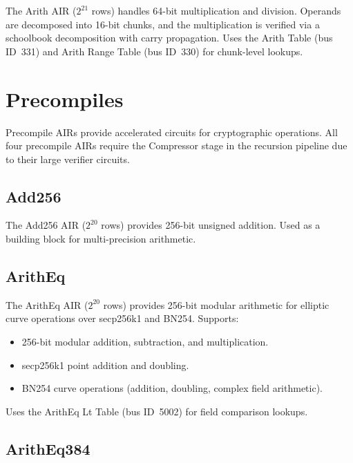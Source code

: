 The Arith AIR ($2^{21}$ rows) handles 64-bit multiplication and division.
Operands are decomposed into 16-bit chunks, and the multiplication
is verified via a schoolbook decomposition with carry propagation.
Uses the Arith Table (bus ID~331) and Arith Range Table (bus ID~330)
for chunk-level lookups.

\section{Precompiles}
\label{sec:precompiles}

Precompile AIRs provide accelerated circuits for cryptographic operations.
All four precompile AIRs require the Compressor stage in the recursion
pipeline due to their large verifier circuits.

\subsection{Add256}
\label{sec:add256}

The Add256 AIR ($2^{20}$ rows) provides 256-bit unsigned addition.
Used as a building block for multi-precision arithmetic.

\subsection{ArithEq}
\label{sec:aritheq}

The ArithEq AIR ($2^{20}$ rows) provides 256-bit modular arithmetic
for elliptic curve operations over secp256k1 and BN254.
Supports:
\begin{itemize}[nosep]
  \item 256-bit modular addition, subtraction, and multiplication.
  \item secp256k1 point addition and doubling.
  \item BN254 curve operations (addition, doubling, complex field arithmetic).
\end{itemize}

Uses the ArithEq Lt Table (bus ID~5002) for field comparison lookups.

\subsection{ArithEq384}
\label{sec:aritheq384}

